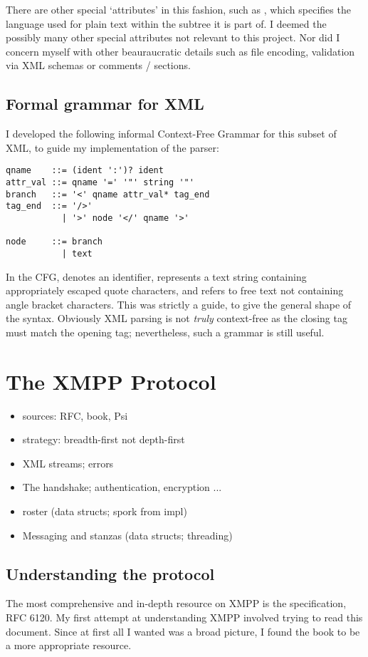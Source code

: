 \documentclass[12pt,a4paper,twoside,openright]{report}
\begin{document}
{There are other special `attributes' in this fashion, such as , which specifies the language used for plain text within the subtree it is part of. I deemed the possibly many other special attributes not relevant to this project. Nor did I concern myself with other beauraucratic details such as file encoding, validation via XML schemas or comments /  sections.

\subsection{Formal grammar for XML}
I developed the following informal Context-Free Grammar for this subset of XML, to guide my implementation of the parser:

\begin{lstlisting}
qname    ::= (ident ':')? ident
attr_val ::= qname '=' '"' string '"'
branch   ::= '<' qname attr_val* tag_end
tag_end  ::= '/>'
           | '>' node '</' qname '>'

node     ::= branch
           | text

\end{lstlisting}
In the CFG,  denotes an identifier,  represents a text string containing appropriately escaped quote characters, and  refers to free text not containing angle bracket characters. This was strictly a guide, to give the general shape of the syntax. Obviously XML parsing is not \emph{truly} context-free as the closing tag must match the opening tag; nevertheless, such a grammar is still useful.

\section{The XMPP Protocol}
\begin{itemize}
  \item sources: RFC, book, Psi
  \item strategy: breadth-first not depth-first
  \item XML streams; errors
  \item The handshake; authentication, encryption ...
  \item roster (data structs; spork from impl)
  \item Messaging and stanzas (data structs; threading)
\end{itemize}
\subsection{Understanding the protocol}
The most comprehensive and in-depth resource on XMPP is the specification, RFC 6120. My first attempt at understanding XMPP involved trying to read this document. Since at first all I wanted was a broad picture, I found the book  to be a more appropriate resource.

}
\end{document}
